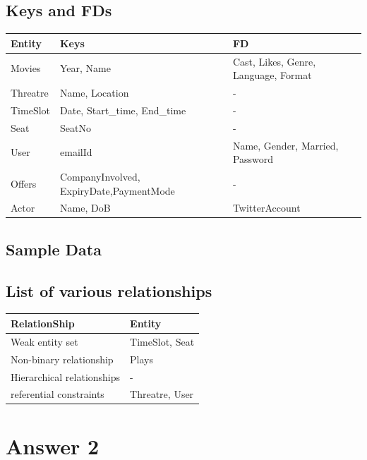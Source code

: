 \documentclass[10pt]{article}
\begin{document}
\subsection{Keys and FDs}
\begin{center}
 \begin{tabular}{| m{6em} | m{8cm}| m{8cm}|} 
 \hline
 Entity & Keys & FD\\ [1ex] 
 \hline
 Movies & Year, Name &  Cast, Likes, Genre, Language, Format \\
 Threatre & Name, Location & -\\
 TimeSlot & Date, Start\_time, End\_time & - \\
 Seat & SeatNo & - \\
 User & emailId & Name, Gender, Married, Password \\
 Offers & CompanyInvolved, ExpiryDate,PaymentMode & - \\
 Actor & Name, DoB & TwitterAccount\\
 \hline 
 \end{tabular}
\end{center}



\subsection{Sample Data}

\subsection{List of various relationships}

\begin{center}
 \begin{tabular}{| m{6em} | m{8cm}|} 
 \hline
 RelationShip & Entity \\ [1ex] 
 \hline
 Weak entity set & TimeSlot, Seat \\
 Non-binary relationship & Plays \\
 Hierarchical relationships & - \\
 referential constraints & Threatre, User \\ 
 
 \hline
 
\end{tabular}
\end{center}


\section{Answer 2}
\end{document}
